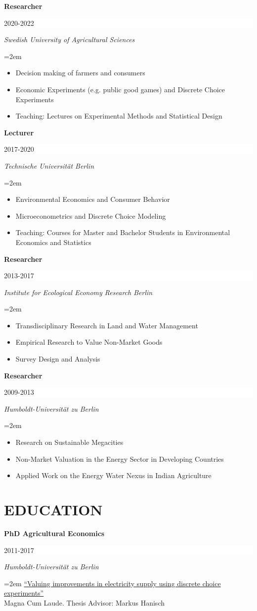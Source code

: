 \documentclass[paper=a4,fontsize=11pt]{scrartcl} %
\newcommand{\sepspace}{\vspace*{1em}}		%
\newcommand{\NewPart}[2]{\section*{\uppercase{#1} #2}}
\newcommand{\EducationEntry}[4]{
		\noindent \textbf{#1} \hfill      %
		\colorbox{White}{%
			\parbox{6em}{%
			\hfill\color{Black}#2}} \par  %
		\noindent \textit{#3} \par        %
		\noindent\hangindent=2em\hangafter=0 \small #4 %
		\normalsize \par}
\begin{document}
\EducationEntry{Researcher}{2020-2022}{Swedish University of Agricultural Sciences}
{\begin{itemize}
\item{Decision making of farmers and consumers}
\item{Economic Experiments (e.g. public good games) and Discrete Choice Experiments}
\item{Teaching: Lectures on Experimental Methods and Statistical Design}
\end{itemize}}
\sepspace

\EducationEntry{Lecturer}{2017-2020}{Technische Universität Berlin}
{\begin{itemize}
\item{Environmental Economics and Consumer Behavior}
\item{Microeconometrics and Discrete Choice Modeling}
\item{Teaching: Courses for Master and Bachelor Students in Environmental Economics and Statistics}
\end{itemize}}
\sepspace

\EducationEntry{Researcher}{2013-2017}{Institute for Ecological Economy Research Berlin}{\begin{itemize}\item{Transdisciplinary Research in Land and Water Management} \item{Empirical Research to Value Non-Market Goods} \item{Survey Design and Analysis}\end{itemize}}
\sepspace
\EducationEntry{Researcher}{2009-2013}{Humboldt-Universität zu Berlin}
{\begin{itemize}\item{Research on Sustainable Megacities} \item {Non-Market Valuation in the Energy Sector in Developing Countries} \item{Applied Work on the Energy Water Nexus in Indian Agriculture}\end{itemize}}


\NewPart{Education}{}

\EducationEntry{PhD Agricultural Economics}{2011-2017}{Humboldt-Universität zu Berlin}{\href{https://edoc.hu-berlin.de/handle/18452/18406?locale-attribute=en}{``Valuing improvements in electricity supply using discrete choice experiments''}\\
Magna Cum Laude. Thesis Advisor: Markus Hanisch}
\sepspace
\end{document}
